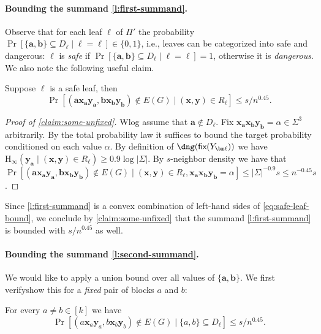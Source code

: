 \documentclass[10pt,a4paper]{article}
\theoremstyle{definition}
\theoremstyle{remark}
\theoremstyle{example}
\theoremstyle{plain}
\newcommand{\fix}{\textsf{\upshape fix}}
\newcommand{\Hmin}{\mathrm{H}_{\infty}}
\newcommand{\protocolPiAlt}{\Pi'}
\newcommand{\myparagraph}[1]{\paragraph{#1}}
\begin{document}
\myparagraph{Bounding the summand \eqref{l:first-summand}.}
Observe that for each leaf $\ell$ of $\protocolPiAlt$ the probability $\Pr[\{\bm a, \bm b\} \subseteq D_{\ell} \mid \bm \ell = \ell] \in \{0,1\}$, i.e., leaves can be categorized into safe and dangerous: $\ell$ is \emph{safe} if $\Pr[\{\bm a, \bm b\} \subseteq D_{\bm \ell} \mid \bm \ell = \ell] = 1$, otherwise it is \emph{dangerous}. We also note the following useful claim.


\begin{claim}\label{claim:some-unfixed}
Suppose $\ell$ is a safe leaf, then
        \begin{equation}
            \Pr[(\bm a \bm x_{\bm a} \bm y_{\bm a}, \bm b \bm x_{\bm b} \bm y_{\bm b}) \not\in E(G)  \mid (\bm x, \bm y) \in R_\ell] \le s/n^{0.45}. \label{eq:safe-leaf-bound}
        \end{equation}
\end{claim}

{}{
\begin{proof}[Proof of \autoref{claim:some-unfixed}]
Wlog assume that $\bm a \notin D_{\bm \ell}$. Fix $\bm x_{\bm a} \bm x_{\bm b} \bm y_{\bm b} = \alpha \in \Sigma^3$ arbitrarily. By the total probability law it suffices to bound the target probability conditioned on each value $\alpha$. By definition of $\dng(\fix(Y_{\bm \ell}))$ we have  $\Hmin(\bm y_{\bm a} \mid (\bm x, \bm y) \in R_\ell) \ge 0.9 \log |\Sigma|$. By $s$-neighbor density we have that $\Pr[(\bm a \bm x_{\bm a}\bm y_{\bm a}, \bm b \bm x_{\bm b} \bm y_{\bm b}) \not\in E(G) \mid (\bm x, \bm y) \in R_\ell, \bm x_{\bm a}\bm x_{\bm b} \bm y_{\bm b} = \alpha] \le |\Sigma|^{-0.9} s \le n^{-0.45} s$. 
\end{proof}
}

Since \eqref{l:first-summand} is a convex combination of left-hand sides of \eqref{eq:safe-leaf-bound}, we conclude by \cref{claim:some-unfixed} that the summand \eqref{l:first-summand} is bounded with $s/n^{0.45}$ as well.


\myparagraph{Bounding the summand \eqref{l:second-summand}.} We would like to apply a union bound over all values of $\{\bm a, \bm b\}$. We first 
{verify}{show} this for a \emph{fixed} pair of blocks $a$ and $b$:
\begin{claim} 
\label{claim:all-fixed}
    For every $a \neq b \in [k]$ we have
    \[\Pr[(a \bm x_a \bm y_a, b \bm x_b \bm y_b) \not\in E(G) \mid \{a,b\} \subseteq D_{\bm \ell}] \le s/n^{0.45}.\]
\end{claim}
\end{document}
